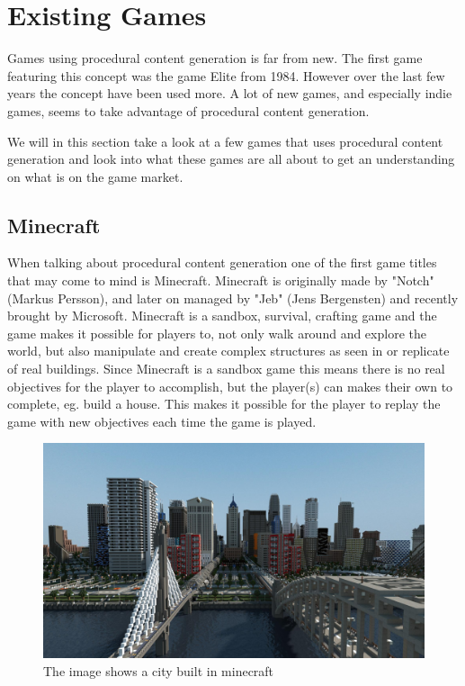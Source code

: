 \section{Existing Games}

Games using procedural content generation is far from new. The first game featuring this concept was the game Elite from 1984\cite{firstpcg}. However over the last few years the concept have been used more. A lot of new games, and especially indie games, seems to take advantage of procedural content generation.

We will in this section take a look at a few games that uses procedural content generation and look into what these games are all about to get an understanding on what is on the game market.


\subsection{Minecraft}

When talking about procedural content generation one of the first game titles that may come to mind is Minecraft. Minecraft is originally made by "Notch" (Markus Persson), and later on managed by "Jeb" (Jens Bergensten)\cite{Minecraft} and recently brought by Microsoft. Minecraft is a sandbox, survival, crafting game and the game makes it possible for players to, not only walk around and explore the world, but also manipulate and create complex structures as seen in  or replicate of real buildings. Since Minecraft is a sandbox game this means there is no real objectives for the player to accomplish, but the player(s) can makes their own to complete, eg. build a house. This makes it possible for the player to replay the game with new objectives each time the game is played.

\begin{figure}[H]
	\includegraphics[width=0.7\linewidth]{img/MinecraftCity}
	\centering
	\caption{The image shows a city built in minecraft}
	\label{fig:MinecraftCity}
\end{figure}



